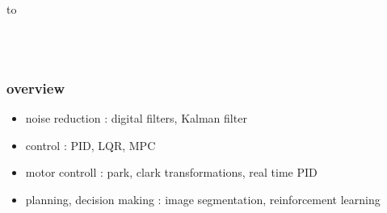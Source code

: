 \documentclass{beamer}
\begin{document}
{
    \usebackgroundtemplate
    {
        \vbox to 
    }

    \begin{frame}
     \centering
     {
        \begin{minipage}{10cm}
           {\LARGE \color{white}{\bf algorithms for robotics}} \\
           {\LARGE \color{white}{\bf Michal CHOVANEC, PhD.}} \\
       \end{minipage}
     }

    \end{frame}
}


\begin{frame}
  
  \frametitle{overview}

  \begin{itemize}
    \item noise reduction             : digital filters, Kalman filter
    \item control                     : PID, LQR, MPC
    \item motor controll              : park, clark transformations, real time PID
    \item planning, decision making   : image segmentation, reinforcement learning
  \end{itemize}
    
\end{frame}
\end{document}
